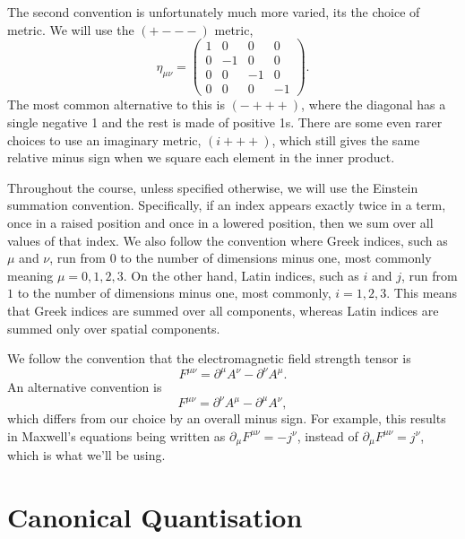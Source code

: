 \documentclass[fleqn]{NotesClass}
\newcommand{\minkowskiMetric}{\eta}
\begin{document}
    The second convention is unfortunately much more varied, its the choice of metric.
    We will use the \(({+}{-}{-}{-})\) metric,
    \begin{equation}
        \minkowskiMetric_{\mu\nu} = 
        \begin{pmatrix}
            1 & 0 & 0 & 0\\
            0 & -1 & 0 & 0\\
            0 & 0 & -1 & 0\\
            0 & 0 & 0 & -1
        \end{pmatrix}
        .
    \end{equation}
    The most common alternative to this is \(({-}{+}{+}{+})\), where the diagonal has a single negative 1 and the rest is made of positive 1s.
    There are some even rarer choices to use an imaginary metric, \((i{+}{+}{+})\), which still gives the same relative minus sign when we square each element in the inner product.
    
    Throughout the course, unless specified otherwise, we will use the Einstein summation convention.
    Specifically, if an index appears exactly twice in a term, once in a raised position and once in a lowered position, then we sum over all values of that index.
    We also follow the convention where Greek indices, such as \(\mu\) and \(\nu\), run from \(0\) to the number of dimensions minus one, most commonly meaning \(\mu = 0, 1, 2, 3\).
    On the other hand, Latin indices, such as \(i\) and \(j\), run from \(1\) to the number of dimensions minus one, most commonly, \(i = 1, 2, 3\).
    This means that Greek indices are summed over all components, whereas Latin indices are summed only over spatial components.
    
    We follow the convention that the electromagnetic field strength tensor is
    \begin{equation}
        F^{\mu\nu} = \partial^\mu A^\nu - \partial^\nu A^\mu.
    \end{equation}
    An alternative convention is
    \begin{equation}
        F^{\mu\nu} = \partial^\nu A^\mu - \partial^\mu A^\nu,
    \end{equation}
    which differs from our choice by an overall minus sign.
    For example, this results in Maxwell's equations being written as \(\partial_\mu F^{\mu\nu} = -j^\nu\), instead of \(\partial_\mu F^{\mu\nu} = j^\nu\), which is what we'll be using.
    
    \part{Canonical Quantisation}
\end{document}

